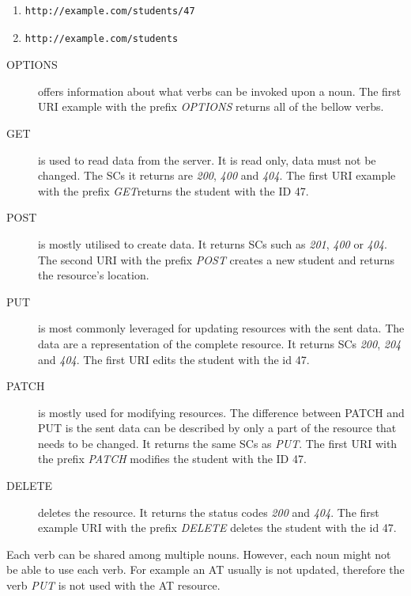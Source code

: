 \begin{enumerate}
\item 
\lstset{style=sharpc}
\begin{lstlisting}
http://example.com/students/47
\end{lstlisting}

\item 
\lstset{style=sharpc}
\begin{lstlisting}
http://example.com/students
\end{lstlisting}
\end{enumerate}

\begin {description}
\item [OPTIONS] offers information about what verbs can be invoked upon a noun. The first URI example with the prefix \textit{OPTIONS} returns all of the bellow verbs. 
\item [GET] is used to read data from the server. It is read only, data must not be changed. The SCs it returns are \textit{200}, \textit{400} and \textit{404}. The first URI example with the prefix \textit{GET}returns the student with the ID 47.
\item [POST] is mostly utilised to create data. It returns SCs such as \textit{201}, \textit{400} or \textit{404}. The second URI with the prefix \textit{POST} creates a new student and returns the resource's location.		
\item [PUT] is most commonly leveraged for updating resources with the sent data. The data are a representation of the complete resource. It returns SCs \textit{200}, \textit{204} and \textit{404}. The first URI edits the student with the id 47.
\item [PATCH] is mostly used for modifying resources. The difference between PATCH and PUT is the sent data can be described by only a part of the resource that needs to be changed. It returns the same SCs as \textit{PUT}. The first URI with the prefix \textit{PATCH} modifies the student with the ID 47.
\item [DELETE] deletes the resource. It returns the status codes \textit{200} and \textit{404}. The first example URI with the prefix \textit{DELETE} deletes the student with the id 47.
\end{description}
Each verb can be shared among multiple nouns. However, each noun might not be able to use each verb. For example an AT usually is not updated, therefore the verb \textit{PUT} is not used with the AT resource.

